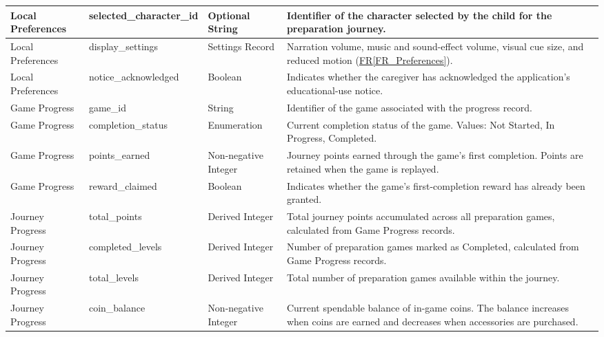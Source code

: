 \documentclass[10pt]{article}
\newcommand{\rref}[1]{\hyperref[#1]{FR\ref*{#1}}}
\begin{document}
\begin{longtable}{
    p{}
    p{}
    p{}
    p{}
}
Local Preferences &
selected\_character\_id &
Optional String &
Identifier of the character selected by the child
for the preparation journey. \\
\midrule

Local Preferences &
display\_settings &
Settings Record &
Narration volume, music and sound-effect volume,
visual cue size, and reduced motion
(\rref{FR_Preferences}). \\
\midrule

Local Preferences &
notice\_acknowledged &
Boolean &
Indicates whether the caregiver has acknowledged
the application's educational-use notice. \\
\midrule

Game Progress &
game\_id &
String &
Identifier of the game associated with the
progress record. \\
\midrule

Game Progress &
completion\_status &
Enumeration &
Current completion status of the game.
Values: Not Started, In Progress, Completed. \\
\midrule

Game Progress &
points\_earned &
Non-negative Integer &
Journey points earned through the game's
first completion. Points are retained
when the game is replayed. \\
\midrule

Game Progress &
reward\_claimed &
Boolean &
Indicates whether the game's first-completion
reward has already been granted. \\
\midrule

Journey Progress &
total\_points &
Derived Integer &
Total journey points accumulated across all
preparation games, calculated from Game
Progress records. \\
\midrule

Journey Progress &
completed\_levels &
Derived Integer &
Number of preparation games marked as
Completed, calculated from Game Progress
records. \\
\midrule

Journey Progress &
total\_levels &
Derived Integer &
Total number of preparation games available
within the journey. \\
\midrule

Journey Progress &
coin\_balance &
Non-negative Integer &
Current spendable balance of in-game coins.
The balance increases when coins are earned
and decreases when accessories are purchased. \\

\end{longtable}
\end{document}
